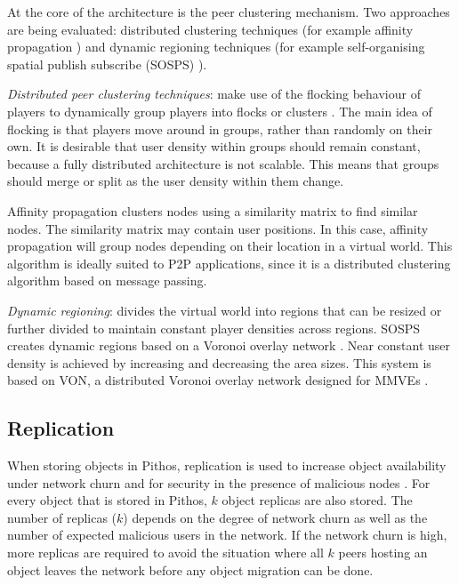 \documentclass[10pt,a4paper,conference]{IEEEtran}
\begin{document}
At the core of the architecture is the peer clustering mechanism. Two approaches are being evaluated: distributed clustering techniques (for example
affinity propagation \cite{affinity_propagation}) and dynamic regioning techniques (for example self-organising spatial publish subscribe (SOSPS)
\cite{self_organising_sps_post}).

\emph{Distributed peer clustering techniques}: make use of the flocking behaviour of players to dynamically group players into flocks or clusters
\cite{flocking}. The main idea of flocking is that players move around in groups, rather than randomly on their own. It is desirable that user
density within groups should remain constant, because a fully distributed architecture is not scalable. This means that groups should merge or split
as the user density within them change.

Affinity propagation clusters nodes using a similarity matrix to find similar nodes. The similarity matrix may contain user positions. In this case,
affinity propagation will group nodes depending on their location in a virtual world. This algorithm is ideally suited to P2P applications, since it
is a distributed clustering algorithm based on message passing.

\emph{Dynamic regioning}: divides the virtual world into regions that can be resized or further divided to maintain constant player densities across
regions. SOSPS creates dynamic regions based on a Voronoi overlay network \cite{voronoi_diagrams_survey}. Near constant user density is achieved by
increasing and decreasing the area sizes. This system is based on VON, a distributed Voronoi overlay network designed for MMVEs \cite{VON_VAST}.

\subsection{Replication}
\label{store_retrieve}

When storing objects in Pithos, replication is used to increase object availability under network churn and for security in the presence of malicious
nodes \cite{storage_and_chaching_PAST}. For every object that is stored in Pithos, $k$ object replicas are also stored. The number of replicas ($k$)
depends on the degree of network churn as well as the number of expected malicious users in the network. If the network churn is high, more replicas
are required to avoid the situation where all $k$ peers hosting an object leaves the network before any object migration can be done.
\end{document}
